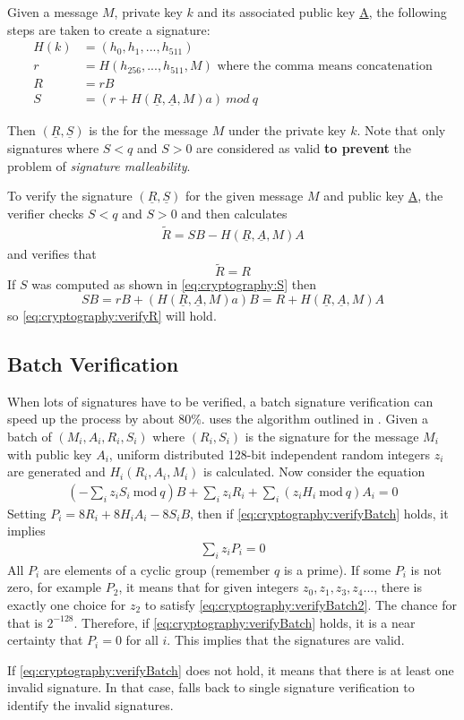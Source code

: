 Given a message $M$, private key $k$ and its associated public key \underline{A}, the following steps are taken to create a signature:
\begin{align}
H(k) &=(h_0, h_1,..., h_{511}) \\
r &= H(h_{256},...,h_{511}, M) \text{ where the comma means concatenation} \\
R &= rB \\
S &= (r + H(\underline{R}, \underline{A}, M)a) \: mod \: q \label{eq:cryptography:S}
\end{align}

Then $(\underline{R}, \underline{S})$ is the  for the message $M$ under the private key $k$.
Note that only signatures where $S<q$ and $S>0$ are considered as valid \textbf{to prevent} the problem of \emph{signature malleability}.

To verify the signature $(\underline{R}, \underline{S})$ for the given message $M$ and public key \underline{A}, the verifier checks $S<q$ and $S>0$ and then calculates
\begin{align*}
\tilde{R} = SB - H(\underline{R}, \underline{A}, M)A
\end{align*}
and verifies that
\begin{equation}
\tilde{R} = R \label{eq:cryptography:verifyR}
\end{equation}
If $S$ was computed as shown in \eqref{eq:cryptography:S} then
$$SB = rB + (H(\underline{R}, \underline{A}, M)a)B = R + H(\underline{R}, \underline{A}, M)A$$
so \eqref{eq:cryptography:verifyR} will hold.

\subsection{Batch Verification}

When lots of signatures have to be verified, a batch signature verification can speed up the process by about 80\%.
\codenamespace uses the algorithm outlined in \cite{Bernstein2011}.
Given a batch of $(M_i, A_i, R_i, S_i)$ where $(R_i, S_i)$ is the signature for the message $M_i$ with public key $A_i$,
uniform distributed 128-bit independent random integers $z_i$ are generated and $H_i(R_i, A_i, M_i)$ is calculated.
Now consider the equation
\begin{align}
\left(-\sum_i{z_i S_i \: \mathrm{mod} \: q}\right)B + \sum_i{z_i R_i} + \sum_i{(z_i H_i \: \mathrm{mod} \: q)A_i = 0} \label{eq:cryptography:verifyBatch}
\end{align}
Setting $P_i = 8 R_i + 8 H_i A_i - 8 S_i B$, then if \eqref{eq:cryptography:verifyBatch} holds, it implies
\begin{align}
\sum_i{z_i P_i} = 0 \label{eq:cryptography:verifyBatch2}
\end{align}
All $P_i$ are elements of a cyclic group (remember $q$ is a prime).
If some $P_i$ is not zero, for example $P_2$, it means that for given integers $z_0, z_1, z_3, z_4 ...$, there is exactly one choice for $z_2$ to satisfy \eqref{eq:cryptography:verifyBatch2}.
The chance for that is $2^{-128}$.
Therefore, if \eqref{eq:cryptography:verifyBatch} holds, it is a near certainty that $P_i = 0$ for all $i$.
This implies that the signatures are valid.

If \eqref{eq:cryptography:verifyBatch} does not hold, it means that there is at least one invalid signature.
In that case, \codenamespace falls back to single signature verification to identify the invalid signatures.
